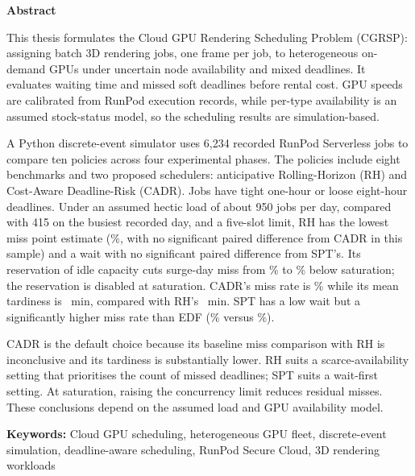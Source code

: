 \newpage
{}

\begin{center}
{\fontsize{20}{24}\selectfont\textbf{Abstract}}
\end{center}

\vspace{20pt}

This thesis formulates the Cloud GPU Rendering Scheduling Problem (CGRSP): assigning batch 3D rendering jobs, one frame per job, to heterogeneous on-demand GPUs under uncertain node availability and mixed deadlines. It evaluates waiting time and missed soft deadlines before rental cost. GPU speeds are calibrated from RunPod execution records, while per-type availability is an assumed stock-status model, so the scheduling results are simulation-based.

A Python discrete-event simulator uses 6,234 recorded RunPod Serverless jobs to compare ten policies across four experimental phases. The policies include eight benchmarks and two proposed schedulers: anticipative Rolling-Horizon (RH) and Cost-Aware Deadline-Risk (CADR). Jobs have tight one-hour or loose eight-hour deadlines. Under an assumed hectic load of about 950 jobs per day, compared with 415 on the busiest recorded day, and a five-slot limit, RH has the lowest miss point estimate (\RHMiss\%, with no significant paired difference from CADR in this sample) and a wait with no significant paired difference from SPT's. Its reservation of idle capacity cuts surge-day miss from \ResSurgeOffMiss\% to \ResSurgeOnMiss\% below saturation; the reservation is disabled at saturation. CADR's miss rate is \CADRmiss\% while its mean tardiness is \CADRtard~min, compared with RH's \RHtard~min. SPT has a low wait but a significantly higher miss rate than EDF (\SPTmiss\% versus \EDFmiss\%).

CADR is the default choice because its baseline miss comparison with RH is inconclusive and its tardiness is substantially lower. RH suits a scarce-availability setting that prioritises the count of missed deadlines; SPT suits a wait-first setting. At saturation, raising the concurrency limit reduces residual misses. These conclusions depend on the assumed load and GPU availability model.

\vspace{0.3cm}
\noindent\textbf{Keywords:} Cloud GPU scheduling, heterogeneous GPU fleet, discrete-event simulation, deadline-aware scheduling, RunPod Secure Cloud, 3D rendering workloads
